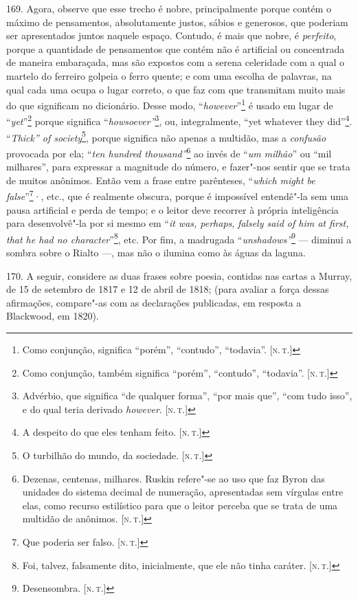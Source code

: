 169. Agora, observe que esse trecho é nobre, principalmente porque
contém o máximo de pensamentos, absolutamente justos, sábios e
generosos, que poderiam ser apresentados juntos naquele espaço. Contudo,
é mais que nobre, é \emph{perfeito}, porque a quantidade de pensamentos
que contém não é artificial ou concentrada de maneira embaraçada, mas
são expostos com a serena celeridade com a qual o martelo do ferreiro
golpeia o ferro quente; e com uma escolha de palavras, na qual cada uma
ocupa o lugar correto, o que faz com que transmitam muito mais do que
significam no dicionário. Desse modo, ``\emph{however}''\footnote{Como
  conjunção, significa ``porém'', ``contudo'', ``todavia''. {[}\textsc{n.\,t.}{]}} é usado em lugar de ``\emph{yet}''\footnote{Como conjunção,
  também significa ``porém'', ``contudo'', ``todavia''. {[}\textsc{n.\,t.}{]}}
porque significa ``\emph{howsoever''}\footnote{Advérbio, que significa
  ``de qualquer forma'', ``por mais que'', ``com tudo isso'', e do qual
  teria derivado \emph{however}. {[}\textsc{n.\,t.}{]}}, ou, integralmente,
``yet whatever they did''\footnote{A despeito do que eles tenham feito.
  {[}\textsc{n.\,t.}{]}}. ``\emph{Thick'' of society}\footnote{O turbilhão do
  mundo, da sociedade. {[}\textsc{n.\,t.}{]}}, porque significa não apenas a
multidão, mas a \emph{confusão} provocada por ela; ``\emph{ten hundred
thousand''}\footnote{Dezenas, centenas, milhares. Ruskin refere"-se ao
  uso que faz Byron das unidades do sistema decimal de numeração,
  apresentadas sem vírgulas entre elas, como recurso estilístico para
  que o leitor perceba que se trata de uma multidão de anônimos. {[}\textsc{n.\,t.}{]}} ao invés de ``\emph{um milhão}'' ou ``mil milhares'', para
expressar a magnitude do número, e fazer"-nos sentir que se trata de
muitos anônimos. Então vem a frase entre parênteses, ``\emph{which might
be false}''\footnote{Que poderia ser falso. {[}\textsc{n.\,t.}{]}}·, etc.,
que é realmente obscura, porque é impossível entendê"-la sem uma pausa
artificial e perda de tempo; e o leitor deve recorrer à própria
inteligência para desenvolvê"-la por si mesmo em ``\emph{it was,
perhaps}, \emph{falsely said of him at first, that he had no
character}''\footnote{Foi, talvez, falsamente dito, inicialmente, que
  ele não tinha caráter. {[}\textsc{n.\,t.}{]}}, etc. Por fim, a madrugada
``\emph{unshadows''}\footnote{Desensombra. {[}\textsc{n.\,t.}{]}} --- diminui a
sombra sobre o Rialto ---, mas não o ilumina como às águas da laguna.

170. A seguir, considere as duas frases sobre poesia, contidas nas
cartas a Murray, de 15 de setembro de 1817 e 12 de abril de 1818; (para
avaliar a força dessas afirmações, compare"-as com as declarações
publicadas, em resposta a Blackwood, em 1820).

